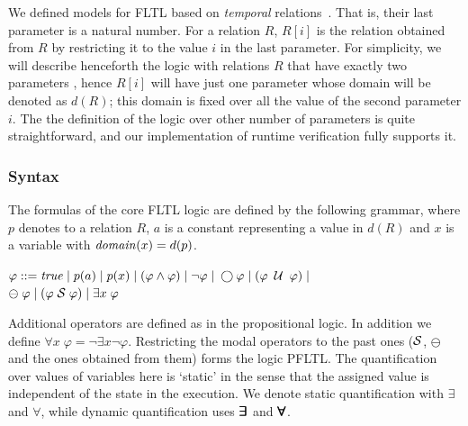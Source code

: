 We defined models for FLTL based on {\em temporal} relations~\cite{Chomicki}. That is,
their last parameter
is a natural number. For a relation $R$, $R [ i ]$ is the relation obtained from $R$ by
restricting it to the value $i$ in the last parameter. For simplicity, we will describe henceforth
the logic with relations $R$ that have exactly two parameters
, hence $R [ i ]$ will have just one parameter whose domain will be denoted as $d ( R )$; this domain is fixed over all the value of the second parameter $i$. The the definition of the logic over other number of parameters is quite straightforward, and our implementation of runtime verification fully supports it.



\subsubsection{Syntax} 

The formulas of the core FLTL logic are 
defined by the following grammar,
where $p$ denotes to a relation $R$,
$a$ is a constant representing a value in $d ( R )$ and $x$ is a variable with $\mathit{domain} ( x ) = d ( p )$.
\begin{center}
$\varphi ::= \mathit{true}  \; | \;
    p ( a ) \; | \;
    p ( x ) \; | \;
    ( \varphi \wedge \varphi ) \;  |   \;
   \neg \varphi \; | \;
   \bigcirc \varphi \; | \; 
   ( \varphi \; \mathbin{\mathcal{U}} \; \varphi ) \; | $ \\
   $ \ominus \; \varphi \; | \;
    ( \varphi  \; {\cal S}  \; \varphi ) \; | \;
    \exists x \; \varphi$
\end{center}


\noindent 

Additional operators are defined as in the propositional logic. In addition we define
$\forall x \; \varphi = \neg \exists x \neg \varphi$.
Restricting the modal operators to the past ones
(${\cal S}$, $\ominus$ and the ones obtained from them) 
forms the logic PFLTL.
The quantification over values of variables here is `static' in the sense that
the assigned value is independent of the state in the execution. We
denote static quantification with $\exists$ and $\forall$, while
dynamic quantification uses $\bm{\exists}\kern-0.6em\bm{\exists}$ and $\bm{\forall}\kern-0.6em\bm{\forall}$.

